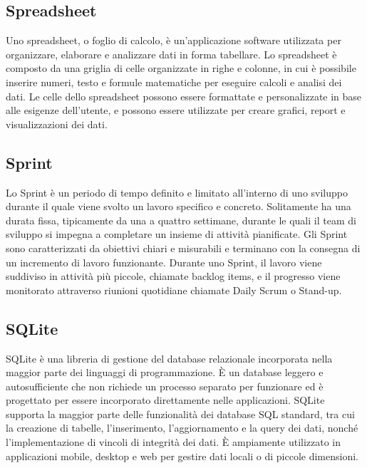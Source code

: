 \vspace{2em}
\subsection*{Spreadsheet}
Uno spreadsheet, o foglio di calcolo, è un'applicazione software utilizzata per organizzare, elaborare e analizzare dati in forma tabellare. Lo spreadsheet è composto da una griglia di celle organizzate in righe e colonne, in cui è possibile inserire numeri, testo e formule matematiche per eseguire calcoli e analisi dei dati. Le celle dello spreadsheet possono essere formattate e personalizzate in base alle esigenze dell'utente, e possono essere utilizzate per creare grafici, report e visualizzazioni dei dati. 

\vspace{2em}
\subsection*{Sprint}
Lo Sprint è un periodo di tempo definito e limitato all'interno di uno sviluppo  durante il quale viene svolto un lavoro specifico e concreto. Solitamente ha una durata fissa, tipicamente da una a quattro settimane, durante le quali il team di sviluppo si impegna a completare un insieme di attività pianificate. Gli Sprint sono caratterizzati da obiettivi chiari e misurabili e terminano con la consegna di un incremento di lavoro funzionante. Durante uno Sprint, il lavoro viene suddiviso in attività più piccole, chiamate backlog items, e il progresso viene monitorato attraverso riunioni quotidiane chiamate Daily Scrum o Stand-up.

\vspace{2em}
\subsection*{SQLite}
SQLite è una libreria di gestione del database relazionale incorporata nella maggior parte dei linguaggi di programmazione. È un database leggero e autosufficiente che non richiede un processo separato per funzionare ed è progettato per essere incorporato direttamente nelle applicazioni. SQLite supporta la maggior parte delle funzionalità dei database SQL standard, tra cui la creazione di tabelle, l'inserimento, l'aggiornamento e la query dei dati, nonché l'implementazione di vincoli di integrità dei dati. È ampiamente utilizzato in applicazioni mobile, desktop e web per gestire dati locali o di piccole dimensioni.

